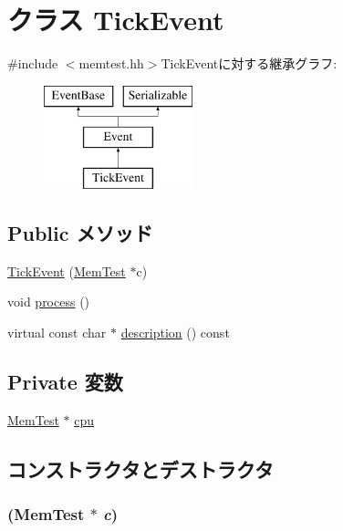 \hypertarget{classMemTest_1_1TickEvent}{
\section{クラス TickEvent}
\label{classMemTest_1_1TickEvent}
}


{\ttfamily \#include $<$memtest.hh$>$}TickEventに対する継承グラフ:\begin{figure}[H]
\begin{center}
\leavevmode
\includegraphics[height=3cm]{classMemTest_1_1TickEvent}
\end{center}
\end{figure}
\subsection*{Public メソッド}
\begin{DoxyCompactItemize}
\item 
\hyperlink{classMemTest_1_1TickEvent_aa94721dd47a6cd7434f6b42fc2f3672b}{TickEvent} (\hyperlink{classMemTest_1_1MemTest}{MemTest} $\ast$c)
\item 
void \hyperlink{classMemTest_1_1TickEvent_a2e9c5136d19b1a95fc427e0852deab5c}{process} ()
\item 
virtual const char $\ast$ \hyperlink{classMemTest_1_1TickEvent_a130ddddf003422b413e2e891b1b80e8f}{description} () const 
\end{DoxyCompactItemize}
\subsection*{Private 変数}
\begin{DoxyCompactItemize}
\item 
\hyperlink{classMemTest_1_1MemTest}{MemTest} $\ast$ \hyperlink{classMemTest_1_1TickEvent_a2f5bd13202a0967a012fbb8cfe08ccc5}{cpu}
\end{DoxyCompactItemize}


\subsection{コンストラクタとデストラクタ}
\hypertarget{classMemTest_1_1TickEvent_aa94721dd47a6cd7434f6b42fc2f3672b}{
\subsubsection[{TickEvent}]{ ({\bf MemTest} $\ast$ {\em c})}}
\label{classMemTest_1_1TickEvent_aa94721dd47a6cd7434f6b42fc2f3672b}



